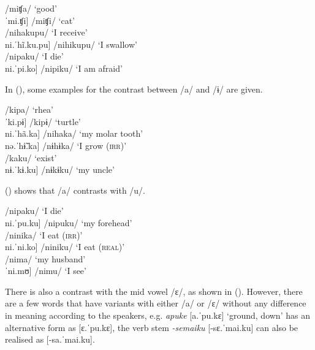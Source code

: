 \ea\label{ex:a-i}
\ea 	\tab[ˈmi.ʧa] \tab\tab /miʧa/ \tab ‘good’\\
 	\tab{[}ˈmi.ʧi] \tab\tab /miʧi/ \tab ‘cat’\\
\ex 	\tab[ni.ˈhã.ku.pu] \tab /nihakupu/ \tab ‘I receive’\\
 	\tab{[}ni.ˈhĩ.ku.pu] \tab /nihikupu/ \tab ‘I swallow’\\
\ex 	\tab[ni.ˈpa.ko] \tab\tab /nipaku/ \tab ‘I die’\\
 	\tab{[}ni.ˈpi.ko] \tab\tab /nipiku/ \tab ‘I am afraid’\\%
\z
\xe

In (), some examples for the contrast between /a/ and /ɨ/ are given.

\ea\label{ex:a-ÿ}
\ea 	\tab[ˈki.pa] \tab /kipa/ \tab ‘rhea’\\
 	\tab{[}ˈki.pɨ] \tab /kipɨ/ \tab\tab ‘turtle’\\
\ex 	\tab{[}ni.ˈhã.ka] \tab /nihaka/ \tab ‘my molar tooth’\\
 	\tab{[}nə.ˈhɨ̃.ka] \tab /nɨhɨka/ \tab ‘I grow (\textsc{irr})’\\
\ex 	\tab[ˈka.ku] \tab /kaku/ \tab ‘exist’\\
 	\tab{[}nɨ.ˈkɨ.ku] \tab /nɨkɨku/ \tab ‘my uncle’\\%
\z
\xe	

() shows that /a/ contrasts with /u/.
	
\ea\label{ex:a-u}
\ea 	\tab[ni.ˈpa.ku] \tab /nipaku/ \tab ‘I die’\\
 	\tab{[}ni.ˈpu.ku] \tab /nipuku/ \tab ‘my forehead’\\
\ex 	\tab[ni.ˈni.ka] \tab /ninika/ \tab ‘I eat (\textsc{irr})’\\
 	\tab{[}ni.ˈni.ko] \tab /niniku/ \tab ‘I eat (\textsc{real})’\\
\ex 	\tab[ˈni.ma] \tab /nima/ \tab ‘my husband’\\
 	\tab{[}ˈni.mʊ] \tab /nimu/ \tab ‘I see’\\%
\z
\xe

There is also a contrast with the mid vowel /ɛ/, as shown in (). However, there are a few words that have variants with either /a/ or /ɛ/ without any difference in meaning according to the speakers, e.g. \textit{apuke} [a.ˈpu.kɛ] ‘ground, down’ has an alternative form as [ɛ.ˈpu.kɛ], the verb stem \textit{-semaiku} [-sɛ.ˈmai.ku] can also be realised as [-sa.ˈmai.ku]. 	

